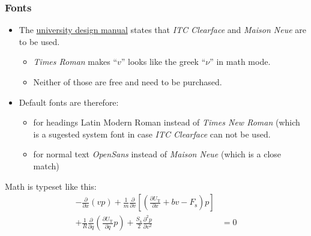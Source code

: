\documentclass[aspectratio=169]{beamer}
\begin{document}
\begin{frame}
  \frametitle{Fonts}
  \begin{itemize}
  \item The \href{https://brandpad.io/usn}{university design manual} states that
    \emph{ITC Clearface} and \emph{Maison Neue} are to be used.
    \begin{itemize}
    \item \textit{Times Roman} makes ``$v$'' looks like the greek ``$\nu$'' in math mode.
    \item Neither of those are free and need to be purchased.
    \end{itemize}
  \item Default fonts are therefore:
    \begin{itemize}
    \item for headings {\rmfamily Latin Modern Roman} instead of \emph{Times New Roman} (which is a sugested system font in case \emph{ITC Clearface} can not be used.
    \item for normal text \emph{OpenSans} instead of \emph{Maison Neue} (which is a close match)
    \end{itemize}
  \end{itemize}
  \vfill

Math is typeset like this:
\begin{align*}
-\frac{\partial}{\partial x}\left(vp\right)
+\frac{1}{m}\frac{\partial}{\partial v}\left[\left( \frac{\partial U_\mathrm{T}}{\partial x} +bv-F_\mathrm{s}\right)p\right] & \\
+\frac{1}{R}\frac{\partial}{\partial q}\left( \frac{\partial U_\mathrm{T}}{\partial q}p\right)
+ \frac{S_\mathrm{a}}{2}\frac{\partial^2p}{\partial v^2} & = 0
\end{align*}
\end{frame}
\end{document}
